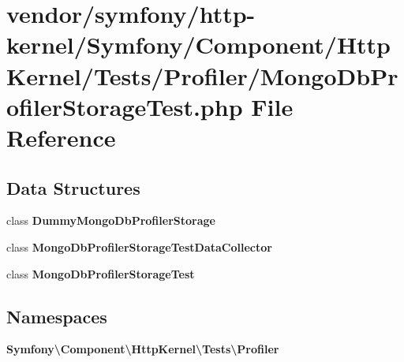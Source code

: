 \section{vendor/symfony/http-\/kernel/\+Symfony/\+Component/\+Http\+Kernel/\+Tests/\+Profiler/\+Mongo\+Db\+Profiler\+Storage\+Test.php File Reference}
\label{_mongo_db_profiler_storage_test_8php}
\subsection*{Data Structures}
\begin{DoxyCompactItemize}
\item 
class {\bf Dummy\+Mongo\+Db\+Profiler\+Storage}
\item 
class {\bf Mongo\+Db\+Profiler\+Storage\+Test\+Data\+Collector}
\item 
class {\bf Mongo\+Db\+Profiler\+Storage\+Test}
\end{DoxyCompactItemize}
\subsection*{Namespaces}
\begin{DoxyCompactItemize}
\item 
 {\bf Symfony\textbackslash{}\+Component\textbackslash{}\+Http\+Kernel\textbackslash{}\+Tests\textbackslash{}\+Profiler}
\end{DoxyCompactItemize}
